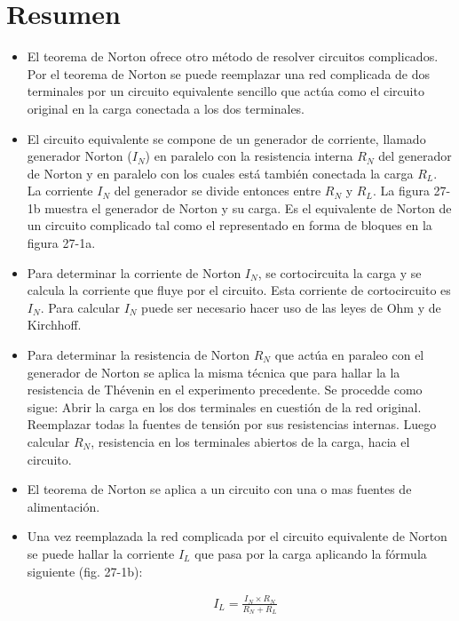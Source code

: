\section{Resumen}
\begin{itemize}[series=resumenlist]
\item El teorema de Norton ofrece otro método de resolver circuitos complicados. 
Por el teorema de Norton se puede reemplazar una red complicada de dos 
terminales por un circuito equivalente sencillo que actúa como el circuito 
original en la carga conectada a los dos terminales.
\item El circuito equivalente se compone de un generador de corriente, llamado
generador Norton ($I_N$) en paralelo con la resistencia interna $R_N$ del 
generador de Norton y en paralelo con los cuales está también conectada 
la carga $R_L$. La corriente $I_N$ del generador se divide entonces entre 
$R_N$ y $R_L$. La figura 27-1b muestra el generador de Norton y su carga. 
Es el equivalente de Norton de un circuito complicado tal como el representado 
en forma de bloques en la figura 27-1a.
\item Para determinar la corriente de Norton $I_N$, se cortocircuita la carga 
y se calcula la corriente que fluye por el circuito. Esta corriente de cortocircuito 
es $I_N$. Para calcular $I_N$ puede ser necesario hacer uso de las leyes de Ohm 
y de Kirchhoff.
\item Para determinar la resistencia de Norton $R_N$ que actúa en paraleo con 
el generador de Norton se aplica la misma técnica que para hallar la 
la resistencia de Thévenin en el experimento precedente. Se procedde como 
sigue: Abrir la carga en los dos terminales en cuestión de la red original. Reemplazar 
todas la fuentes de tensión por sus resistencias internas. Luego calcular $R_N$, 
resistencia en los terminales abiertos de la carga, hacia el circuito.
\item El teorema de Norton se aplica a un circuito con una o mas fuentes de 
alimentación.
\item Una vez reemplazada la red complicada por el circuito equivalente de Norton 
se puede hallar la corriente $I_L$ que pasa por la carga aplicando la fórmula 
siguiente (fig. 27-1b):

\begin{equation}
\begin{split}
    &I_L = \frac{I_N \times R_N}{R_N + R_L}
\end{split} \tag{}
\end{equation}
\end{itemize}